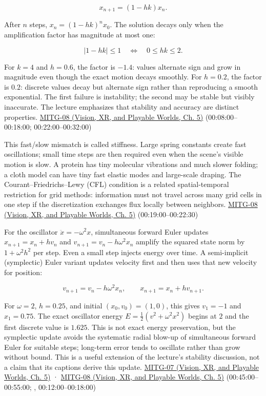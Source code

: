 \[
x_{n+1}=(1-hk)x_n.
\]

After \(n\) steps, \(x_n=(1-hk)^nx_0\). The solution decays only when the amplification factor has magnitude at most one:

\[
|1-hk|\le1\quad\Longleftrightarrow\quad 0\le hk\le2.
\]

For \(k=4\) and \(h=0.6\), the factor is \(-1.4\): values alternate sign and grow in magnitude even though the exact motion decays smoothly. For \(h=0.2\), the factor is \(0.2\): discrete values decay but alternate sign rather than reproducing a smooth exponential. The first failure is instability; the second may be stable but visibly inaccurate. The lecture emphasizes that stability and accuracy are distinct properties. \href{../07-Vision-XR-and-Playable-Worlds/main.pdf\#nameddest=04-visual-computing-ii-ch036-mitg-08---cloth-simulation}{MITG-08 (Vision, XR, and Playable Worlds, Ch. 5)} (00:08:00--00:18:00; 00:22:00--00:32:00)

This fast/slow mismatch is called stiffness. Large spring constants create fast oscillations; small time steps are then required even when the scene's visible motion is slow. A protein has tiny molecular vibrations and much slower folding; a cloth model can have tiny fast elastic modes and large-scale draping. The Courant--Friedrichs--Lewy (CFL) condition is a related spatial-temporal restriction for grid methods: information must not travel across many grid cells in one step if the discretization exchanges flux locally between neighbors. \href{../07-Vision-XR-and-Playable-Worlds/main.pdf\#nameddest=04-visual-computing-ii-ch036-mitg-08---cloth-simulation}{MITG-08 (Vision, XR, and Playable Worlds, Ch. 5)} (00:19:00--00:22:30)

For the oscillator \(\ddot{x}=-\omega^2x\), simultaneous forward Euler updates \(x_{n+1}=x_n+h v_n\) and \(v_{n+1}=v_n-h\omega^2x_n\) amplify the squared state norm by \(1+\omega^2h^2\) per step. Even a small step injects energy over time. A semi-implicit (symplectic) Euler variant updates velocity first and then uses that new velocity for position:

\[
v_{n+1}=v_n-h\omega^2x_n,\qquad x_{n+1}=x_n+h v_{n+1}.
\]

For \(\omega=2\), \(h=0.25\), and initial \((x_0,v_0)=(1,0)\), this gives \(v_1=-1\) and \(x_1=0.75\). The exact oscillator energy \(E=\frac12(v^2+\omega^2x^2)\) begins at \(2\) and the first discrete value is \(1.625\). This is not exact energy preservation, but the symplectic update avoids the systematic radial blow-up of simultaneous forward Euler for suitable steps; long-term error tends to oscillate rather than grow without bound. This is a useful extension of the lecture's stability discussion, not a claim that its captions derive this update. \href{../07-Vision-XR-and-Playable-Worlds/main.pdf\#nameddest=04-visual-computing-ii-ch036-mitg-07---particle-systems}{MITG-07 (Vision, XR, and Playable Worlds, Ch. 5)} · \href{../07-Vision-XR-and-Playable-Worlds/main.pdf\#nameddest=04-visual-computing-ii-ch036-mitg-08---cloth-simulation}{MITG-08 (Vision, XR, and Playable Worlds, Ch. 5)} (00:45:00--00:55:00; , 00:12:00--00:18:00)

